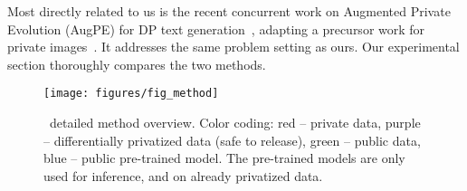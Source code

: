 Most directly related to us is the recent concurrent work on Augmented Private Evolution (AugPE) for DP text generation~\cite{api2}, adapting a precursor work for private images~\cite{lin2023differentially}. It addresses the same problem setting as ours. Our experimental section thoroughly compares the two methods. 


\begin{figure*}[t]
\vskip 0.2in
\begin{center}
\centerline{\texttt{[image: figures/fig\_method]}}
\caption{\textbf{\alg}~detailed method overview. Color coding: \textcolor{methodred}{red -- private data}, \textcolor{methodpurple}{purple -- differentially privatized data (safe to release)}, \textcolor{methodgreen}{green -- public data}, \textcolor{methodblue}{blue -- public pre-trained model}. The pre-trained models are only used for inference, and on already privatized data.}\label{fig:flow}
\end{center}
\vskip -0.2in
\end{figure*}